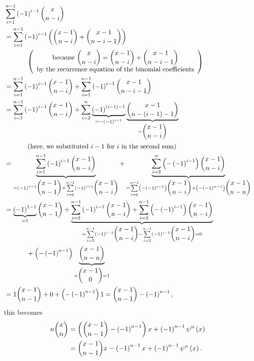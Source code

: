 \documentclass[numbers=enddot,12pt,final,onecolumn,notitlepage]{scrartcl}%
\begin{document}
\begin{align*}
&  \sum_{i=1}^{n-1}\left(  -1\right)  ^{i-1}\dbinom{x}{n-i}\\
&  =\sum_{i=1}^{n-1}\left(  -1\right)  ^{i-1}\left(  \dbinom{x-1}{n-i}%
+\dbinom{x-1}{n-i-1}\right)  \\
&  \ \ \ \ \ \ \ \ \ \ \left(
\begin{array}
[c]{c}%
\text{because }\dbinom{x}{n-i}=\dbinom{x-1}{n-i}+\dbinom{x-1}{n-i-1}\\
\text{by the recurrence equation of the binomial coefficients}%
\end{array}
\right)  \\
&  =\sum_{i=1}^{n-1}\left(  -1\right)  ^{i-1}\dbinom{x-1}{n-i}+\sum
_{i=1}^{n-1}\left(  -1\right)  ^{i-1}\dbinom{x-1}{n-i-1}\\
&  =\sum_{i=1}^{n-1}\left(  -1\right)  ^{i-1}\dbinom{x-1}{n-i}+\sum_{i=2}%
^{n}\underbrace{\left(  -1\right)  ^{\left(  i-1\right)  -1}}_{=-\left(
-1\right)  ^{i-1}}\underbrace{\dbinom{x-1}{n-\left(  i-1\right)  -1}%
}_{=\dbinom{x-1}{n-i}}\\
&  \ \ \ \ \ \ \ \ \ \ \left(  \text{here, we substituted }i-1\text{ for
}i\text{ in the second sum}\right)  \\
&  =\underbrace{\sum_{i=1}^{n-1}\left(  -1\right)  ^{i-1}\dbinom{x-1}{n-i}%
}_{=\left(  -1\right)  ^{1-1}\dbinom{x-1}{n-1}+\sum\limits_{i=2}^{n-1}\left(
-1\right)  ^{i-1}\dbinom{x-1}{n-i}}+\underbrace{\sum_{i=2}^{n}\left(  -\left(
-1\right)  ^{i-1}\right)  \dbinom{x-1}{n-i}}_{=\sum\limits_{i=2}^{n-1}\left(
-\left(  -1\right)  ^{i-1}\right)  \dbinom{x-1}{n-i}+\left(  -\left(
-1\right)  ^{n-1}\right)  \dbinom{x-1}{n-n}}\\
&  =\underbrace{\left(  -1\right)  ^{1-1}}_{=1}\dbinom{x-1}{n-1}%
+\underbrace{\sum\limits_{i=2}^{n-1}\left(  -1\right)  ^{i-1}\dbinom{x-1}%
{n-i}+\sum\limits_{i=2}^{n-1}\left(  -\left(  -1\right)  ^{i-1}\right)
\dbinom{x-1}{n-i}}_{=\sum\limits_{i=2}^{n-1}\left(  -1\right)  ^{i-1}%
\dbinom{x-1}{n-i}-\sum\limits_{i=2}^{n-1}\left(  -1\right)  ^{i-1}\dbinom
{x-1}{n-i}=0}\\
&  \ \ \ \ \ \ \ \ \ \ +\left(  -\left(  -1\right)  ^{n-1}\right)
\underbrace{\dbinom{x-1}{n-n}}_{=\dbinom{x-1}{0}=1}\\
&  =1\dbinom{x-1}{n-1}+0+\left(  -\left(  -1\right)  ^{n-1}\right)
1=\dbinom{x-1}{n-1}-\left(  -1\right)  ^{n-1},
\end{align*}
this becomes%
\begin{align*}
n\dbinom{x}{n} &  =\left(  \dbinom{x-1}{n-1}-\left(  -1\right)  ^{n-1}\right)
x+\left(  -1\right)  ^{n-1}\psi^{n}\left(  x\right)  \\
&  =\dbinom{x-1}{n-1}x-\left(  -1\right)  ^{n-1}x+\left(  -1\right)
^{n-1}\psi^{n}\left(  x\right)  .
\end{align*}
\end{document}
